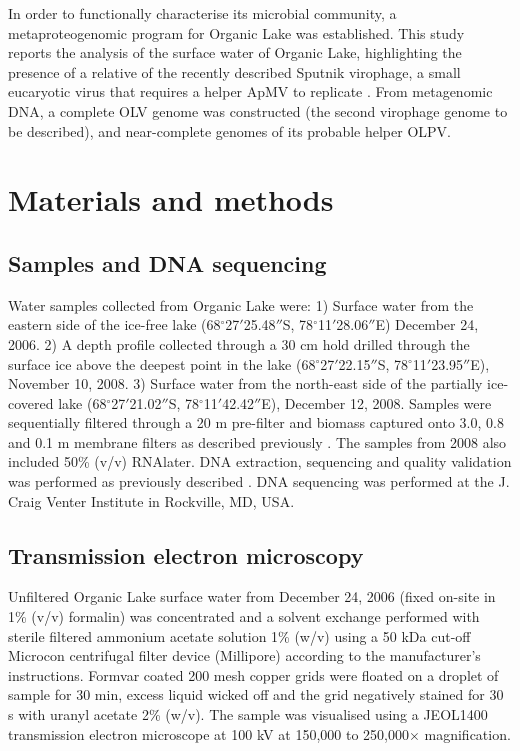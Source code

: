 In order to functionally characterise its microbial community, a metaproteogenomic program for Organic Lake was established.
This study reports the analysis of the surface water of Organic Lake, highlighting the presence of a relative of the recently described Sputnik virophage, a small eucaryotic virus that requires a helper \ac{ApMV} to replicate \cite{LaScola2008}. 
From metagenomic \textsc{DNA}, a complete \ac{OLV} genome was constructed (the second virophage genome to be described), and near-complete genomes of its probable helper \ac{OLPV}.


\section{Materials and methods}

\subsection{Samples and DNA sequencing}
Water samples collected from Organic Lake were: 1) Surface water from the eastern side of the ice-free lake (68$^{\circ}$27$'$25.48$''$S, 78$^{\circ}$11$'$28.06$''$E) December 24, 2006.
2) A depth profile collected through a 30 cm hold drilled through the surface ice above the deepest point in the lake (68$^{\circ}$27$'$22.15$''$S, 78$^{\circ}$11$'$23.95$''$E), November 10, 2008. 
3) Surface water from the north-east side of the partially ice-covered lake (68$^{\circ}$27$'$21.02$''$S, 78$^{\circ}$11$'$42.42$''$E), December 12, 2008. 
Samples were sequentially filtered through a 20 \textmu{}m pre-filter and biomass captured onto 3.0, 0.8 and 0.1 \textmu{}m membrane filters as described previously \cite{Ng2010a, Lauro2011}. 
The samples from 2008 also included 50\% (v/v) \textsc{RNA}later. 
DNA extraction, sequencing and quality validation was performed as previously described \cite{Ng2010a, Lauro2011}. 
DNA sequencing was performed at the J. Craig Venter Institute in Rockville, \textsc{MD}, \textsc{USA}.  

\subsection{Transmission electron microscopy}
Unfiltered Organic Lake surface water from December 24, 2006 (fixed on-site in 1\% (v/v) formalin) was concentrated and a solvent exchange performed with sterile filtered ammonium acetate solution 1\% (w/v) using a 50 kDa cut-off Microcon centrifugal filter device (Millipore) according to the manufacturer’s instructions. 
Formvar coated 200 mesh copper grids were floated on a droplet of sample for 30 min, excess liquid wicked off and the grid negatively stained for 30 s with uranyl acetate 2\% (w/v). 
The sample was visualised using a \textsc{JEOL1400} transmission electron microscope at 100 kV at 150,000 to 250,000$\times$ magnification.

